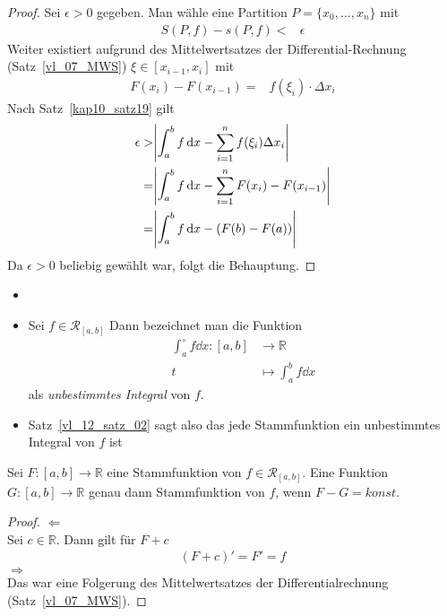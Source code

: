 \begin{proof}
	Sei $\epsilon >0 $ gegeben. Man wähle eine Partition $P = \{x_0, \hdots, x_n\}$ 
	mit 
	\begin{align*}
		S(P,f) - s(P,f) < & \epsilon
	\end{align*}
	Weiter existiert aufgrund des Mittelwertsatzes der Differential-Rechnung
	(Satz~\ref{vl_07_MWS}) 
	$\xi \in [x_{i-1}, x_i]$ mit 
	\begin{align*}
		F(x_i) - F(x_{i-1}) = &  f(\xi_i) \cdot \Delta x_i
	\end{align*}
	Nach Satz~\ref{kap10_satz19}
	gilt 
	\begin{align*}
		\epsilon > & \abs{ \int_a^b f \dd{x} - \sum_{i=1}^n f(\xi_i) \Delta x_i} \\
		= & \abs{ \int_a^b f \dd{x} - \sum_{i=1}^n F(x_i) -F(x_{i-1})} \\
		= & \abs{ \int_a^b f \dd{x} - (F(b) -F(a))}
	\end{align*}
	Da $\epsilon > 0$ beliebig gewählt war, folgt die Behauptung.	
\end{proof}

\begin{Bemerkung}{
	\begin{itemize}
	\item[ ]
		\item Sei $f \in \mathcal{R}_{[a,b]}$ Dann bezeichnet man die Funktion 
		\begin{align*}
			\int_a^{\circ} f\dd{x} :  [a,b]  & \rightarrow \mathbb{R} \\
			 t & \mapsto \int_a^b f\dd{x}
		\end{align*}
		als \emph{unbestimmtes Integral} von $f$.
		\item Satz~\ref{vl_12_satz_02}
		sagt also das jede Stammfunktion ein unbestimmtes Integral von $f$ ist 
	\end{itemize}
}\end{Bemerkung}

\begin{Proposition}{
	Sei $F: [a,b] \rightarrow \mathbb{R}$ eine Stammfunktion von $f \in \mathcal{R}
	_{[a,b]}$. Eine Funktion $G: [a,b] \rightarrow \mathbb{R}$ genau dann 
	Stammfunktion von $f$, wenn $F-G = konst.$
}\end{Proposition}

\begin{proof}
	 $\Leftarrow$ \\
	Sei $c \in \mathbb{R}$. Dann gilt für $F + c$ 
	\begin{align*}
		(F+ c)' = F' = f
	\end{align*}
	$\Rightarrow$ \\
	Das war eine Folgerung des Mittelwertsatzes der Differentialrechnung 
	(Satz~\ref{vl_07_MWS}).
\end{proof}


